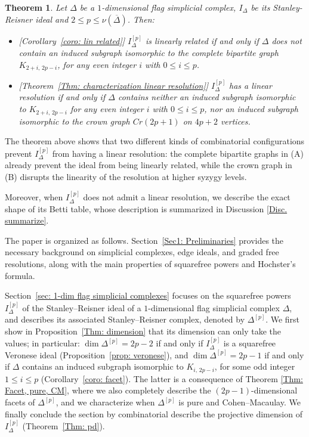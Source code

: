 \documentclass[12pt]{amsart}
\newtheorem{Theorem}{Theorem}[section]
\begin{document}
\begin{Theorem}
Let $\Delta$ be a $1$-dimensional flag simplicial complex, $I_{\Delta}$ be its Stanley-Reisner ideal and $2 \leq p \leq \nu(\overline{\Delta})$. Then: 

\begin{itemize}
\item[(A)] \textup{[Corollary~\ref{coro: lin related}]}
$I_{\Delta}^{[p]}$ is linearly related if and only if $\Delta$ does not contain an induced subgraph isomorphic to the complete bipartite graph $K_{2+i,\,2p-i}$, for any even integer $i$ with $0 \leq i \leq p$.

\item[(B)] \textup{[Theorem~\ref{Thm: characterization linear resolution}]}
$I_{\Delta}^{[p]}$ has a linear resolution if and only if $\Delta$ contains neither an induced subgraph isomorphic to $K_{2+i,\,2p-i}$ for any even integer $i$ with $0 \leq i \leq p$, nor an induced subgraph isomorphic to the crown graph $Cr(2p+1)$ on $4p+2$ vertices.
\end{itemize}
\end{Theorem}

The theorem above shows that two different kinds of combinatorial configurations prevent $I_{\Delta}^{[p]}$ from having a linear resolution: the complete bipartite graphs in (A) already prevent the ideal from being linearly related, while the crown graph in (B) disrupts the linearity of the resolution at higher syzygy levels.

Moreover, when $I_{\Delta}^{[p]}$ does not admit a linear resolution, we describe the exact shape of its Betti table, whose description is summarized in Discussion \ref{Disc. summarize}.


The paper is organized as follows. Section~\ref{Sec1: Preliminaries} provides the necessary background on simplicial complexes, edge ideals, and graded free resolutions, along with the main properties of squarefree powers and Hochster's formula.

Section~\ref{sec: 1-dim flag simplicial complexes} focuses on the squarefree powers $I_{\Delta}^{[p]}$ of the Stanley--Reisner ideal of a $1$-dimensional flag simplicial complex $\Delta$, and describes its associated Stanley--Reisner complex, denoted by $\Delta^{[p]}$. We first show in Proposition~\ref{Thm: dimension} that its dimension can only take the values; in particular: $\dim \Delta^{[p]}=2p-2$ if and only if $I_{\Delta}^{[p]}$ is a squarefree Veronese ideal (Proposition~\ref{prop: veronese}), and $\dim \Delta^{[p]}=2p-1$ if and only if $\Delta$ contains an induced subgraph isomorphic to $K_{i,\,2p-i}$, for some odd integer $1 \leq i \leq p$ (Corollary~\ref{coro: facet}). The latter is a consequence of Theorem \ref{Thm: Facet, pure, CM}, where we also completely describe the $(2p-1)$-dimensional facets of $\Delta^{[p]}$, and we characterize when $\Delta^{[p]}$ is pure and Cohen--Macaulay. We finally conclude the section by combinatorial describe the projective dimension of $I_{\Delta}^{[p]}$ (Theorem~\ref{Thm: pd}).
\end{document}
